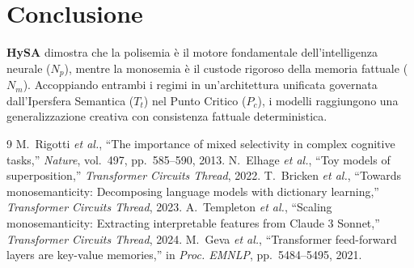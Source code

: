 \documentclass[10pt,twocolumn]{article}
\theoremstyle{definition}
\begin{document}
\section{Conclusione}
\textbf{HySA} dimostra che la polisemia è il motore fondamentale dell'intelligenza neurale ($N_p$), mentre la monosemia è il custode rigoroso della memoria fattuale ($N_m$). Accoppiando entrambi i regimi in un'architettura unificata governata dall'Ipersfera Semantica ($T_t$) nel Punto Critico ($P_c$), i modelli raggiungono una generalizzazione creativa con consistenza fattuale deterministica.

\begin{thebibliography}{9}
\footnotesize
{} M.~Rigotti \textit{et al.}, ``The importance of mixed selectivity in complex cognitive tasks,'' \textit{Nature}, vol.~497, pp.~585--590, 2013.
 N.~Elhage \textit{et al.}, ``Toy models of superposition,'' \textit{Transformer Circuits Thread}, 2022.
 T.~Bricken \textit{et al.}, ``Towards monosemanticity: Decomposing language models with dictionary learning,'' \textit{Transformer Circuits Thread}, 2023.
 A.~Templeton \textit{et al.}, ``Scaling monosemanticity: Extracting interpretable features from Claude 3 Sonnet,'' \textit{Transformer Circuits Thread}, 2024.
 M.~Geva \textit{et al.}, ``Transformer feed-forward layers are key-value memories,'' in \textit{Proc. EMNLP}, pp.~5484--5495, 2021.
\end{thebibliography}
\end{document}
